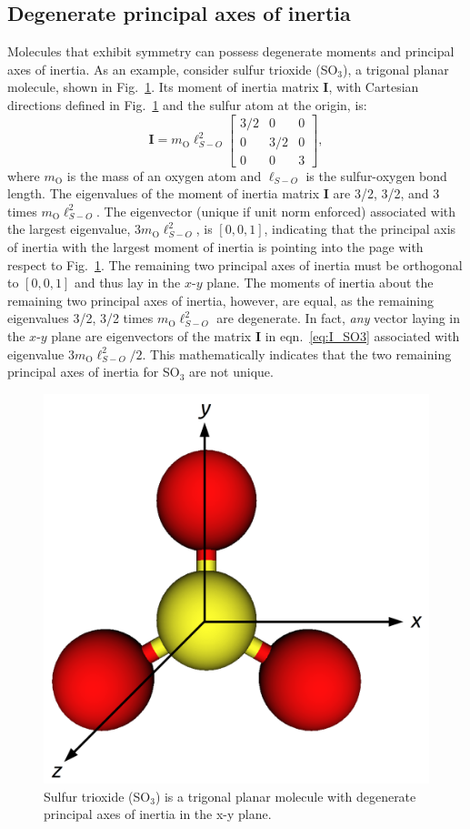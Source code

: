 \documentclass[journal=jacsat,manuscript=article]{achemso}
\begin{document}
{\color{red}
\subsection{Degenerate principal axes of inertia}
Molecules that exhibit symmetry can possess degenerate moments and principal axes of inertia. As an example, consider sulfur trioxide (SO$_3$), a trigonal planar molecule, shown in Fig.~\ref{fig:SO3}. Its moment of inertia matrix $\mathbf{I}$, with Cartesian directions defined in Fig.~\ref{fig:SO3} and the sulfur atom at the origin, is:
\begin{equation}
\mathbf{I} = m_{\text{O}} \ell_{S-O}^2
  \begin{bmatrix}
    3/2 & 0 & 0 \\
    0 & 3/2 & 0 \\
    0 & 0 & 3
  \end{bmatrix}, \label{eq:I_SO3}
\end{equation} where $m_{\text{O}}$ is the mass of an oxygen atom and $\ell_{S-O}$ is the sulfur-oxygen bond length. The eigenvalues of the moment of inertia matrix $\mathbf{I}$ are 3/2, 3/2, and 3 times $m_{\text{O}} \ell_{S-O}^2$. The eigenvector (unique if unit norm enforced) associated with the largest eigenvalue, $3 m_{\text{O}} \ell_{S-O}^2$, is $[0, 0, 1]$, indicating that the principal axis of inertia with the largest moment of inertia is pointing into the page with respect to Fig.~\ref{fig:SO3}. The remaining two principal axes of inertia must be orthogonal to $[0, 0, 1]$ and thus lay in the $x$-$y$ plane. The moments of inertia about the remaining two principal axes of inertia, however, are equal, as the remaining eigenvalues 3/2, 3/2 times $m_{\text{O}} \ell_{S-O}^2$ are degenerate. In fact, \emph{any} vector laying in the $x$-$y$ plane are eigenvectors of the matrix $\mathbf{I}$ in eqn.~\ref{eq:I_SO3} associated with eigenvalue $3m_{\text{O}} \ell_{S-O}^2/2$. This mathematically indicates that the two remaining principal axes of inertia for SO$_3$ are not unique.

\begin{figure}
\centering
	\includegraphics[width=0.3\columnwidth]{../principal_axes_rotation_failure/SO3_axes_marked.png}
	\caption{{\color{red} Sulfur trioxide (SO$_3$) is a trigonal planar molecule with degenerate principal axes of inertia in the x-y plane.
	}%
	} \label{fig:SO3}
\end{figure}

}
\end{document}
